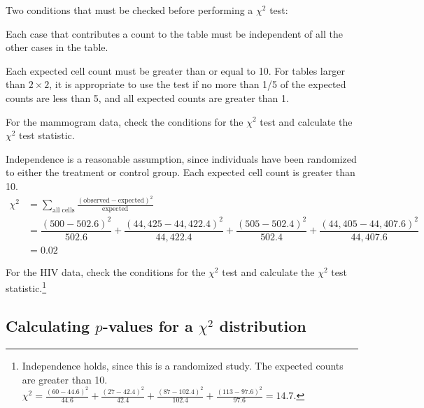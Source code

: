 \begin{termBox}{
Two conditions that must be checked before performing a $\chi^2$ test:\vspace{-1mm}
\begin{description}
\setlength{\itemsep}{0mm}
	\item[Independence.] Each case that contributes a count to the table must be independent of all the other cases in the table.
	\item[Sample size.] Each expected cell count must be greater than or equal to 10. For tables larger than $2 \times 2$, it is appropriate to use the test if no more than 1/5 of the expected counts are less than 5, and all expected counts are greater than 1.
      
\vspace{-1mm}
\end{description}
}
\end{termBox}


\begin{example}{For the mammogram data, check the conditions for the $\chi^2$ test and calculate the $\chi^2$ test statistic.}

Independence is a reasonable assumption, since individuals have been randomized to either the treatment or control group. Each expected cell count is greater than 10.
\begin{align*}
\chi^2 &= \sum_{\text{all cells}} \frac{(\text{observed} - \text{expected})^2}{\text{expected}} \\
&= \dfrac{(500 - 502.6)^2}{502.6} + \dfrac{(44,425 - 44,422.4)^2}{44,422.4} + \dfrac{(505 - 502.4)^2}{502.4} + \dfrac{(44,405 - 44,407.6)^2}{44,407.6} \\
&=0.02
\end{align*}	
	
\end{example}

\begin{exercise} For the HIV data, check the conditions for the $\chi^2$ test and calculate the $\chi^2$ test statistic.\footnote{Independence holds, since this is a randomized study. The expected counts are greater than 10. $\chi^2 = \frac{(60-44.6)^2}{44.6} + \frac{(27-42.4)^2}{42.4} + \frac{(87-102.4)^2}{102.4} + \frac{(113-97.6)^2}{97.6} = 14.7.$}
	
\end{exercise}

\subsection{Calculating $p$-values for a $\chi^2$ distribution}

